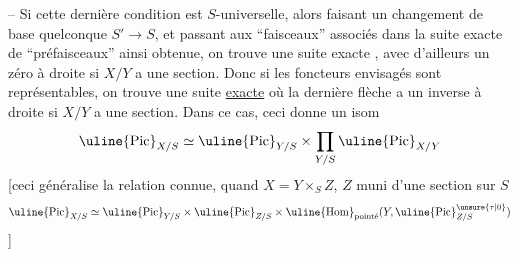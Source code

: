 -- Si cette dernière condition est $S$-universelle, alors  faisant un changement de base quelconque $S'\longrightarrow S$, et passant aux ``faisceaux'' associés dans la suite exacte de  ``préfaisceaux'' ainsi obtenue, on trouve une suite exacte
,
avec d'ailleurs un zéro à droite  si $X/Y$ a une section. Donc si les foncteurs envisagés sont représentables, on trouve une suite \uline{exacte}
où la dernière flèche a un inverse à droite si $X/Y$ a une section. Dans ce cas, ceci donne un isom
\[
\uline{\operatorname{Pic}}_{X/S}\simeq\uline{\operatorname{Pic}}_{Y/S}\times\prod_{Y/S}\uline{\operatorname{Pic}}_{X/Y}
\]
[ceci généralise la relation connue, quand $X=Y\times_S Z$, $Z$ muni d'une section sur $S$
\[
\uline{\operatorname{Pic}}_{X/S}\simeq\uline{\operatorname{Pic}}_{Y/S}\times\uline{\operatorname{Pic}}_{Z/S}\times\uline{\operatorname{Hom}}_{\text{pointé}}(Y,\uline{\operatorname{Pic}}^{\unsure{\tau|0}}_{Z/S})
\]
]


